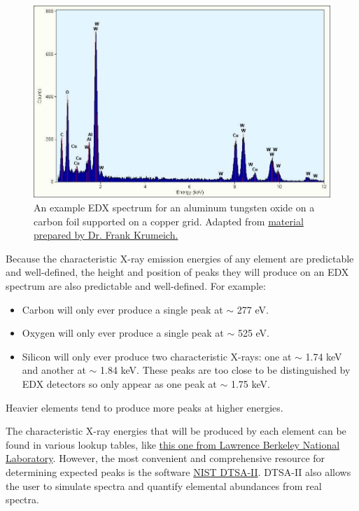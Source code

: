 \documentclass[letterpaper, 12pt]{article}
\begin{document}
\begin{figure}[h!tbp]
    \includegraphics[width=\textwidth]{img/edx/beispiel_EDX.jpg}
    \caption*{ An example EDX spectrum for an aluminum tungsten oxide on a carbon foil supported on a copper grid. Adapted from \href{https://www.microscopy.ethz.ch/xray_spectrum.htm}{material prepared by Dr. Frank Krumeich.}}
\end{figure}

\pagebreak

Because the characteristic X-ray emission energies of any element are predictable and well-defined, the height and position of peaks they will produce on an EDX spectrum are also predictable and well-defined. For example:

\begin{itemize}
    \setlength\itemsep{-0.5em}
    \item Carbon will only ever produce a single peak at $\sim$ 277 eV.
    \item Oxygen will only ever produce a single peak at $\sim$ 525 eV.
    \item Silicon will only ever produce two characteristic X-rays: one at $\sim$ 1.74 keV and another at $\sim$ 1.84 keV. These peaks are too close to be distinguished by EDX detectors so only appear as one peak at $\sim$ 1.75 keV.
\end{itemize}

Heavier elements tend to produce more peaks at higher energies.

The characteristic X-ray energies that will be produced by each element can be found in various lookup tables, like \href{https://xdb.lbl.gov/Section1/Periodic_Table/X-ray_Elements.html}{this one from Lawrence Berkeley National Laboratory}. However, the most convenient and comprehensive resource for determining expected peaks is the software \href{https://www.cstl.nist.gov/div837/837.02/epq/dtsa2/index.html}{NIST DTSA-II}. DTSA-II also allows the user to simulate spectra and quantify elemental abundances from real spectra.
\end{document}
